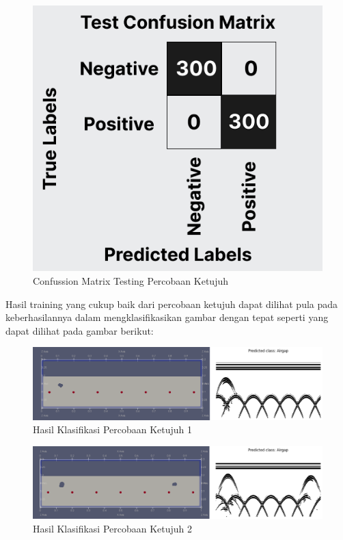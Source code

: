 \begin{figure} [H] \centering
    \includegraphics[scale=0.3]{gambar/bab4/testcon7.png}
    \caption{Confussion Matrix Testing Percobaan Ketujuh}
    \label{fig:testcon7}
\end{figure}

Hasil training yang cukup baik dari percobaan ketujuh dapat dilihat pula pada keberhasilannya dalam mengklasifikasikan gambar dengan tepat seperti yang dapat dilihat pada gambar berikut:

\begin{figure} [H] \centering
    \includegraphics[scale=0.2]{gambar/bab4/Airgap 19997.png}
    \caption{Hasil Klasifikasi Percobaan Ketujuh 1}
\end{figure}

\begin{figure} [H] \centering
    \includegraphics[scale=0.2]{gambar/bab4/Airgap 20007.png}
    \caption{Hasil Klasifikasi Percobaan Ketujuh 2}
\end{figure}

